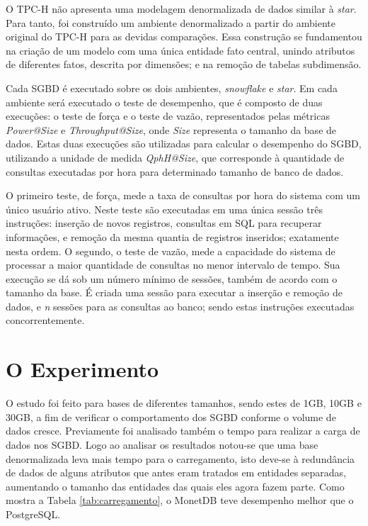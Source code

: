 \documentclass[12pt]{article}
\begin{document}
O TPC-H não apresenta uma modelagem denormalizada de dados similar à \textit{star}. Para tanto, foi construído 
um ambiente denormalizado a partir do ambiente original do TPC-H para as devidas comparações. 
Essa construção se fundamentou na criação de um modelo com 
uma única entidade fato central, unindo atributos de diferentes fatos, descrita por dimensões; e 
na remoção de tabelas subdimensão.

Cada SGBD é executado sobre os dois ambientes, \textit{snowflake} e \textit{star}.
Em cada ambiente será executado o teste de desempenho, que é composto de duas execuções: 
o teste de força e o teste de vazão, representados pelas métricas \textit{Power@Size} e \textit{Throughput@Size}, 
onde \textit{Size} representa o tamanho da base de dados. Estas duas execuções são utilizadas para calcular o 
desempenho do SGBD, utilizando a unidade de medida \textit{QphH@Size}, que corresponde à quantidade 
de consultas executadas por hora para determinado tamanho de banco de dados.

O primeiro teste, de força, mede a taxa de consultas por hora do sistema com um único usuário ativo. 
Neste teste são executadas em uma única sessão três instruções: inserção de novos registros, consultas 
em SQL para recuperar informações, e remoção da mesma quantia de registros inseridos; exatamente nesta ordem. O 
segundo, o teste de vazão, mede a capacidade do sistema de processar a maior quantidade de consultas no menor 
intervalo de tempo. Sua execução se dá sob um número mínimo de sessões, também de acordo com o tamanho 
da base. É criada uma sessão para executar a inserção e remoção de dados, e \textit{n} sessões para as consultas ao 
banco; sendo estas instruções executadas concorrentemente.

\section{O Experimento}

O estudo foi feito para bases de diferentes tamanhos, sendo estes de 1GB, 10GB e 30GB, a fim de 
verificar o comportamento dos SGBD conforme o volume de dados cresce. Previamente foi analisado 
também o tempo para realizar a carga de dados nos SGBD. Logo ao analisar os resultados notou-se que uma base 
denormalizada leva mais tempo para o carregamento, isto deve-se à redundância de dados de alguns atributos que 
antes eram tratados em entidades separadas, aumentando o tamanho das entidades das quais eles agora fazem parte. 
Como mostra a Tabela \ref{tab:carregamento}, o MonetDB teve desempenho melhor que o PostgreSQL.
\end{document}
